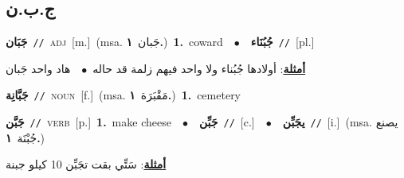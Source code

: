 \documentclass[10pt,a4paper,twoside]{article} %
\begin{document}
\begin{multicols}{2}
\vspace{-3mm}
\subsection*{\color{blue}\foreignlanguage{arabic}{ج.ب.ن}\color{blue}{}} 

{\setlength\topsep{0pt}\textbf{\foreignlanguage{arabic}{جَبَان}}\ {\color{gray}\texttt{//}\color{black}}\ \textsc{adj}\ [m.]\ \color{gray}(msa. \foreignlanguage{arabic}{جَبان}~\foreignlanguage{arabic}{\textbf{١.}})\color{black}\ \textbf{1.}~coward\ \ $\bullet$\ \ \setlength\topsep{0pt}\textbf{\foreignlanguage{arabic}{جُبُنَاء}}\ {\color{gray}\texttt{//}\color{black}}\ [pl.]\  \begin{flushright}\color{gray}\foreignlanguage{arabic}{\textbf{\underline{\foreignlanguage{arabic}{أمثلة}}}: أولادها جُبُناء ولا واحد فيهم زلمة قد حاله\ $\bullet$\ \  هاد واحد جَبان}\end{flushright}\color{black}} \vspace{2mm}

{\setlength\topsep{0pt}\textbf{\foreignlanguage{arabic}{جَبَّانِة}}\ {\color{gray}\texttt{//}\color{black}}\ \textsc{noun}\ [f.]\ \color{gray}(msa. \foreignlanguage{arabic}{مَقْبَرَة}~\foreignlanguage{arabic}{\textbf{١.}})\color{black}\ \textbf{1.}~cemetery\ } \vspace{2mm}

{\setlength\topsep{0pt}\textbf{\foreignlanguage{arabic}{جَبَّن}}\ {\color{gray}\texttt{//}\color{black}}\ \textsc{verb}\ [p.]\ \textbf{1.}~make cheese\ \ $\bullet$\ \ \setlength\topsep{0pt}\textbf{\foreignlanguage{arabic}{جَبِّن}}\ {\color{gray}\texttt{//}\color{black}}\ [c.]\ \ $\bullet$\ \ \setlength\topsep{0pt}\textbf{\foreignlanguage{arabic}{يجَبِّن}}\ {\color{gray}\texttt{//}\color{black}}\ [i.]\ \color{gray}(msa. \foreignlanguage{arabic}{يصنع جُبْنَة}~\foreignlanguage{arabic}{\textbf{١.}})\color{black}\  \begin{flushright}\color{gray}\foreignlanguage{arabic}{\textbf{\underline{\foreignlanguage{arabic}{أمثلة}}}: سَتِّي بقت تجَبِّن 10 كيلو جبنة}\end{flushright}\color{black}} \vspace{2mm}


\end{multicols}
\end{document}
